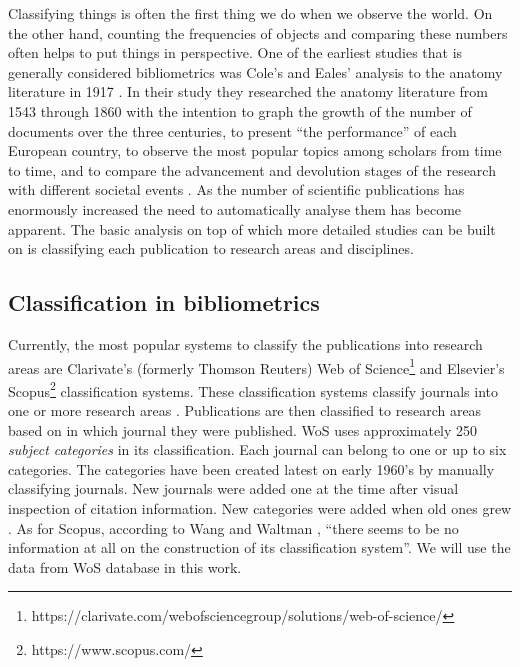 Classifying things is often the first thing we do when we observe 
the world. On the other hand, counting the frequencies of objects
and comparing these numbers often helps to put things in 
perspective.
One of the earliest studies that is generally considered
bibliometrics was Cole's and Eales' analysis to the anatomy 
literature in 1917 \cite{cole_history_1917}. In their study they 
researched the anatomy literature from 1543 through 1860 with the 
intention to graph the growth of the number of documents over 
the three centuries, to present ``the performance'' of each 
European country, to observe the most popular topics among 
scholars from time to time, and to compare the advancement and 
devolution stages of the research with different societal 
events \cite{bellis_bibliometrics_2009}.
As the number of scientific publications has enormously increased
the need to automatically analyse them has become apparent.
The basic analysis on top of which more detailed studies can be 
built on is classifying each publication to research areas and
disciplines.


\subsection{Classification in bibliometrics}
Currently, the most popular systems to classify the publications 
into research areas are Clarivate's (formerly Thomson Reuters)
Web of Science\footnote{https://clarivate.com/webofsciencegroup/solutions/web-of-science/} 
and Elsevier's Scopus\footnote{https://www.scopus.com/} classification
systems. These classification systems classify journals into
one or more research areas \cite{waltman_new_2012}. Publications
are then classified to research areas based on in which journal they
were published. WoS uses approximately 250 \emph{subject categories}
in its classification. Each journal can belong 
to one or up to six categories. The categories have been created
latest on early 1960's by manually classifying journals.
New journals were added one at the time after visual inspection of
citation information. New categories were added when old ones
grew \cite{pudovkin_algorithmic_2002}. As for Scopus, according to 
Wang and Waltman \cite{wang_large-scale_2016}, ``there seems to be no 
information at all on the construction of its classification 
system''. We will use the data from WoS database in this work.

